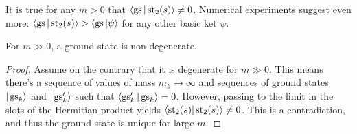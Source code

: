 \begin{conj}
It is true for any $m > 0$ that $\langle \operatorname{gs}|\operatorname{st}_2(s)\rangle \neq 0$. Numerical experiments suggest even more: $\langle \operatorname{gs} | \operatorname{st}_2(s)\rangle > \langle \operatorname{gs} | \psi \rangle$ for any other basic ket $\psi$.
\end{conj}


\begin{proposition}
For $m \gg 0$, a ground state is non-degenerate.
\end{proposition}
\begin{proof}
Assume on the contrary that it is degenerate for $m \gg 0$. This means there's a sequence of values of mass $m_k \rightarrow \infty$ and sequences of ground states $|\operatorname{gs}_k\rangle$ and $|\operatorname{gs}^\prime_k\rangle$ such that $\langle\operatorname{gs}_k^\prime|\operatorname{gs}_k\rangle = 0$. However, passing to the limit in the slots of the Hermitian product yields $\langle \operatorname{st}_2(s) | \operatorname{st}_2(s) \rangle \neq 0$. This is a contradiction, and thus the ground state is unique for large $m$.
\end{proof}


